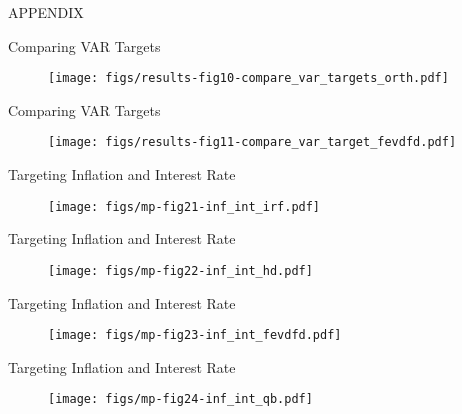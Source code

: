 \begin{frame}
  \frametitle{}
  \centering
  \Huge
  APPENDIX
\end{frame}

\begin{frame}{Comparing VAR Targets}

  \begin{figure}
    \texttt{[image: figs/results-fig10-compare\_var\_targets\_orth.pdf]}
  \end{figure}

\end{frame}



\begin{frame}{Comparing VAR Targets}

  \begin{figure}
    \texttt{[image: figs/results-fig11-compare\_var\_target\_fevdfd.pdf]}
  \end{figure}

\end{frame}


\begin{frame}{Targeting Inflation and Interest Rate}

  \begin{figure}
    \texttt{[image: figs/mp-fig21-inf\_int\_irf.pdf]}
  \end{figure}

\end{frame}


\begin{frame}{Targeting Inflation and Interest Rate}

  \begin{figure}
    \texttt{[image: figs/mp-fig22-inf\_int\_hd.pdf]}
  \end{figure}

\end{frame}



\begin{frame}{Targeting Inflation and Interest Rate}

  \begin{figure}
    \texttt{[image: figs/mp-fig23-inf\_int\_fevdfd.pdf]}
  \end{figure}

\end{frame}

\begin{frame}{Targeting Inflation and Interest Rate}

  \begin{figure}
    \texttt{[image: figs/mp-fig24-inf\_int\_qb.pdf]}
  \end{figure}

\end{frame}